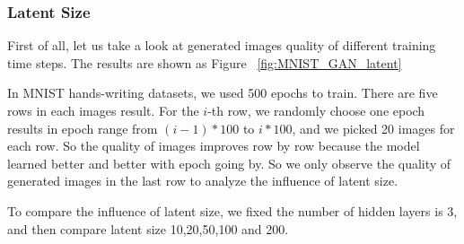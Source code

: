\documentclass[12pt,letterpaper]{article}
\begin{document}
\subsubsection{Latent Size}

First of all, let us take a look at generated images quality of different training time steps. The results are shown as Figure ~\ref{fig:MNIST_GAN_latent}

In MNIST hands-writing datasets, we used 500 epochs to train. There are five rows in each images result. For the $i$-th row, we randomly choose one epoch results in epoch range from $(i-1)*100$ to $i*100$, and we picked 20 images for each row. So the quality of images improves row by row because the model learned better and better with epoch going by. So we only observe the quality of generated images in the last row to analyze the influence of latent size.

To compare the influence of latent size, we fixed the number of hidden layers is $3$, and then compare latent size 10,20,50,100 and 200.
\end{document}

